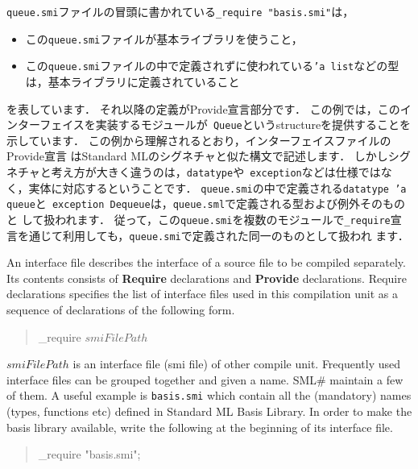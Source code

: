 \documentclass{jbook}
\newcommand{\smlsharp}{SML\#}
\newenvironment{program}{\begin{tt}\begin{quote}}{\end{quote}\end{tt}}
\begin{document}
	{\tt queue.smi}ファイルの冒頭に書かれている{\tt \_require
"basis.smi"}は，
\begin{itemize}
\item この{\tt queue.smi}ファイルが基本ライブラリを使うこと，
\item この{\tt queue.smi}ファイルの中で定義されずに使われている{\tt 'a
list}などの型は，基本ライブラリに定義されていること
\end{itemize}
を表しています．
	それ以降の定義がProvide宣言部分です．
	この例では，このインターフェイスを実装するモジュールが{\tt
Queue}というstructureを提供することを示しています．
	この例から理解されるとおり，インターフェイスファイルのProvide宣言
はStandard MLのシグネチャと似た構文で記述します．
	しかしシグネチャと考え方が大きく違うのは，{\tt datatype}や{\tt
exception}などは仕様ではなく，実体に対応するということです．
	{\tt queue.smi}の中で定義される{\tt datatype 'a queue}と{\tt
exception Dequeue}は，{\tt queue.sml}で定義される型および例外そのものと
して扱われます．
	従って，この{\tt queue.smi}を複数のモジュールで{\tt \_require}宣
言を通じて利用しても，{\tt queue.smi}で定義された同一のものとして扱われ
ます．
\else%

	An interface file describes the interface of a source file to be
compiled separately.
	Its contents consists of 
{\bf Require} declarations and
{\bf Provide} declarations.
	Require declarations specifies the list of interface files
used in this compilation unit as a sequence of declarations of the
following form.
\begin{program}
\_require $smiFilePath$
\end{program}
	$smiFilePath$ is an interface file (smi file) of other compile unit.
	Frequently used interface files can be grouped together and given a
name.
	\smlsharp{} maintain a few of them.
	A useful example is {\tt basis.smi} which contain
all the (mandatory) names (types, functions etc) defined in Standard ML
Basis Library. 
	In order to make the basis library available, write the
following at the beginning of its interface file.
\begin{program}
\_require "basis.smi";
\end{program}
\end{document}
